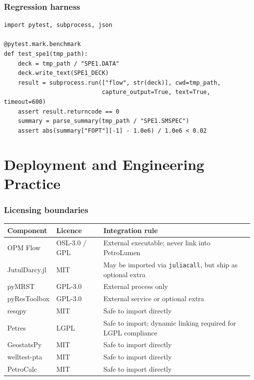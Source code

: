 \documentclass[10pt,a4paper]{article}
\begin{document}
\section{Regression harness}

\begin{lstlisting}[caption={Pytest fixture for SPE1 regression.}]
import pytest, subprocess, json

@pytest.mark.benchmark
def test_spe1(tmp_path):
    deck = tmp_path / "SPE1.DATA"
    deck.write_text(SPE1_DECK)
    result = subprocess.run(["flow", str(deck)], cwd=tmp_path,
                            capture_output=True, text=True, timeout=600)
    assert result.returncode == 0
    summary = parse_summary(tmp_path / "SPE1.SMSPEC")
    assert abs(summary["FOPT"][-1] - 1.0e6) / 1.0e6 < 0.02
\end{lstlisting}

\part{Deployment and Engineering Practice}

\section{Licensing boundaries}

\begin{longtable}{@{}p{3.4cm}p{2.4cm}p{8.4cm}@{}}
\toprule
\textbf{Component} & \textbf{Licence} & \textbf{Integration rule}\\
\midrule
OPM Flow & OSL-3.0 / GPL & External executable; never link into PetroLumen\\
JutulDarcy.jl & MIT & May be imported via \texttt{juliacall}, but ship as optional extra\\
pyMRST & GPL-3.0 & External process only\\
pyResToolbox & GPL-3.0 & External service or optional extra\\
resqpy & MIT & Safe to import directly\\
Petres & LGPL & Safe to import; dynamic linking required for LGPL compliance\\
GeostatsPy & MIT & Safe to import directly\\
welltest-pta & MIT & Safe to import directly\\
PetroCalc & MIT & Safe to import directly\\
\bottomrule
\end{longtable}
\end{document}
